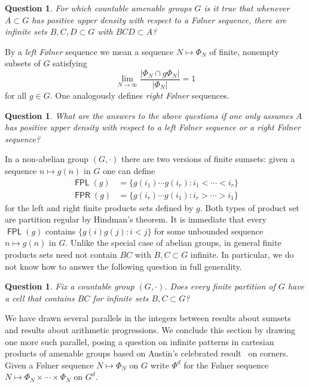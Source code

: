 \documentclass[10pt,dvipsnames]{article}
\newtheorem{question}[theorem]{Question}
\theoremstyle{definition}
\theoremstyle{plain}
\newcommand{\define}[1]{\textit{#1}}
\newcommand{\Folner}{F\o{}lner}
\DeclareMathOperator{\fpl}{\mathsf{FPL}}
\DeclareMathOperator{\fpr}{\mathsf{FPR}}
\begin{document}
\begin{question}
For which countable amenable groups $G$ is it true that whenever $A\subset G$ has positive upper density with respect to a \Folner{} sequence, there are infinite sets $B,C,D \subset G$ with $BCD \subset A$?
\end{question}

By a \define{left \Folner{}} sequence we mean a sequence $N \mapsto \Phi_N$ of finite, nonempty subsets of $G$ satisfying
\[
\lim_{N \to \infty} \dfrac{|\Phi_N \cap g \Phi_N|}{|\Phi_N|} = 1
\]
for all $g \in G$.
One analogously defines \define{right \Folner{}} sequences.

\begin{question}
What are the answers to the above questions if one only assumes $A$ has positive upper density with respect to a left \Folner{} sequence or a right \Folner{} sequence?
\end{question}

In a non-abelian group $(G,\cdot)$ there are two versions of finite sumsets: given a sequence $n \mapsto g(n)$ in $G$ one can define
\begin{align*}
\fpl(g) &= \{ g(i_1) \cdots g(i_r) : i_1 < \cdots < i_r \} \\
\fpr(g) &= \{ g(i_r) \cdots g(i_1) : i_r  > \cdots > i_1 \}
\end{align*}
for the left and right finite products sets defined by $g$.
Both types of product set are partition regular by Hindman's theorem.
It is immediate that every $\fpl(g)$ contains $\{ g(i) g(j) : i < j \}$ for some unbounded sequence $n \mapsto g(n)$ in $G$.
Unlike the special case of abelian groups, in general finite products sets need not contain $BC$ with $B,C \subset G$ infinite.
In particular, we do not know how to answer the following question in full generality.

\begin{question}
Fix a countable group $(G,\cdot)$.
Does every finite partition of $G$ have a cell that contains $BC$ for infinite sets $B,C \subset G$?
\end{question}


We have drawn several parallels in the integers between results about sumsets and results about arithmetic progressions.
We conclude this section by drawing one more such parallel, posing a question on infinite patterns in cartesian products of amenable groups based on Austin's celebrated result~\cite{austin2016} on corners.
Given a \Folner{} sequence $N \mapsto \Phi_N$ on $G$ write $\Phi^d$ for the \Folner{} sequence $N \mapsto \Phi_N \times \cdots \times \Phi_N$ on $G^d$.
\end{document}
